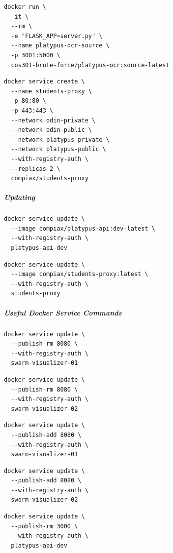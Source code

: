 \documentclass[12pt,a4paper]{article}
\begin{document}
\vspace{0.5cm}
\begin{lstlisting}
docker run \
  -it \
  --rm \
  -e "FLASK_APP=server.py" \
  --name platypus-ocr-source \
  -p 3001:5000 \
  cos301-brute-force/platypus-ocr:source-latest
\end{lstlisting}
\vspace{0.5cm}
\begin{lstlisting}
docker service create \
  --name students-proxy \
  -p 80:80 \
  -p 443:443 \
  --network odin-private \
  --network odin-public \
  --network platypus-private \
  --network platypus-public \
  --with-registry-auth \
  --replicas 2 \
  compiax/students-proxy
\end{lstlisting}

\subparagraph{Updating}
\subparagraph{}
\begin{lstlisting}
docker service update \
  --image compiax/platypus-api:dev-latest \
  --with-registry-auth \
  platypus-api-dev
\end{lstlisting}

\begin{lstlisting}
docker service update \
  --image compiax/students-proxy:latest \
  --with-registry-auth \
  students-proxy
\end{lstlisting}

\subparagraph{Useful Docker Service Commands}
\subparagraph{}

\begin{lstlisting}
docker service update \
  --publish-rm 8080 \
  --with-registry-auth \
  swarm-visualizer-01
\end{lstlisting}

\begin{lstlisting}
docker service update \
  --publish-rm 8080 \
  --with-registry-auth \
  swarm-visualizer-02
\end{lstlisting}

\begin{lstlisting}
docker service update \
  --publish-add 8080 \
  --with-registry-auth \
  swarm-visualizer-01
\end{lstlisting}

\begin{lstlisting}
docker service update \
  --publish-add 8080 \
  --with-registry-auth \
  swarm-visualizer-02
\end{lstlisting}

\begin{lstlisting}
docker service update \
  --publish-rm 3000 \
  --with-registry-auth \
  platypus-api-dev
\end{lstlisting}
\end{document}
